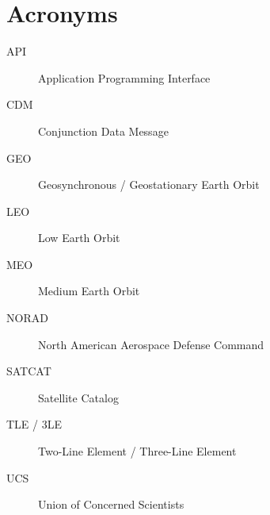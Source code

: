 \section*{Acronyms}
\begin{description}
    \item[API] Application Programming Interface
    \item[CDM] Conjunction Data Message
    \item[GEO] Geosynchronous / Geostationary Earth Orbit
    \item[LEO] Low Earth Orbit
    \item[MEO] Medium Earth Orbit
    \item[NORAD] North American Aerospace Defense Command
    \item[SATCAT] Satellite Catalog
    \item[TLE / 3LE] Two-Line Element / Three-Line Element
    \item[UCS] Union of Concerned Scientists
\end{description}
